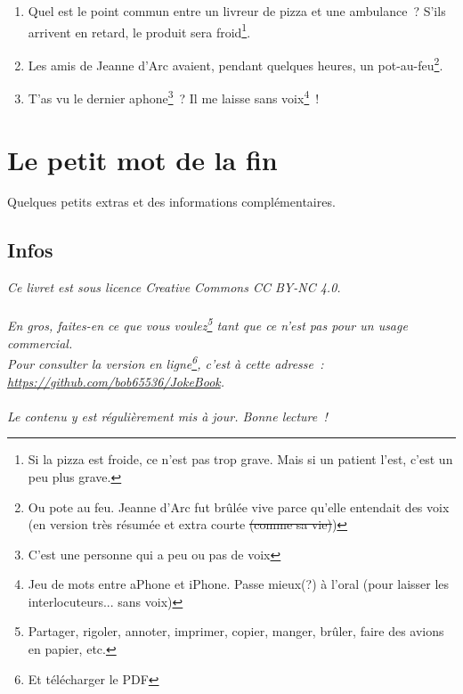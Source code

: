 \documentclass[10pt,a5paper,fullpage]{book}
\begin{document}
\begin{enumerate}
		\item Quel est le point commun entre un livreur de pizza et une ambulance~? S’ils arrivent en retard, le produit sera froid\footnote{Si la pizza est froide, ce n'est pas trop grave. Mais si un patient l'est, c'est un peu plus grave.}. 
		\item Les amis de Jeanne d'Arc avaient, pendant quelques heures, un pot-au-feu\footnote{Ou pote au feu. Jeanne d'Arc fut brûlée vive parce qu'elle entendait des voix (en version très résumée et extra courte \sout{(comme sa vie)})}. 
		\item T'as vu le dernier aphone\footnote{C'est une personne qui a peu ou pas de voix}~? Il me laisse sans voix\footnote{Jeu de mots entre aPhone et iPhone. Passe mieux(?) à l'oral (pour laisser les interlocuteurs... sans voix)}~!
	\end{enumerate}
	
	\chapter{Le petit mot de la fin}
	Quelques petits extras et des informations complémentaires. 
	\section{Infos}
	\textit{Ce livret est sous licence \textit{Creative Commons CC BY-NC 4.0}. 
	\\ \\En gros, faites-en ce que vous voulez\footnote{Partager, rigoler, annoter, imprimer, copier, manger, brûler, faire des avions en papier, etc.} tant que ce n'est pas pour un usage commercial. 
	\\Pour consulter la version en ligne\footnote{Et télécharger le PDF}, c'est à cette adresse~: \underline{https://github.com/bob65536/JokeBook}. 
	\\ \\Le contenu y est régulièrement mis à jour. Bonne lecture~!}  
	\newpage
	\thispagestyle{empty}
	\
	\newpage %
	\thispagestyle{empty}
	\
	\newpage %
\end{document}
